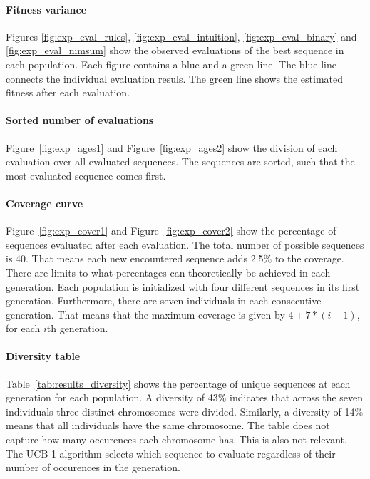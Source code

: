 \paragraph{Fitness variance}
Figures \ref{fig:exp_eval_rules}, \ref{fig:exp_eval_intuition},
\ref{fig:exp_eval_binary} and \ref{fig:exp_eval_nimsum} show the observed
evaluations of the best sequence in each population. Each figure contains a
blue and a green line. The blue line connects the individual evaluation resuls.
The green line shows the estimated fitness after each evaluation.
\paragraph{Sorted number of evaluations}
Figure~\ref{fig:exp_ages1} and Figure~\ref{fig:exp_ages2} show the division of
each evaluation over all evaluated sequences. The sequences are sorted, such
that the most evaluated sequence comes first.
\paragraph{Coverage curve}
Figure~\ref{fig:exp_cover1} and Figure~\ref{fig:exp_cover2} show the percentage
of sequences evaluated after each evaluation. The total number of possible
sequences is 40. That means each new encountered sequence adds 2.5\% to the
coverage. There are limits to what percentages can theoretically be achieved in
each generation. Each population is initialized with four different sequences
in its first generation. Furthermore, there are seven individuals in each
consecutive generation. That means that the maximum coverage is given by
$4+7*(i-1)$, for each $i$th generation.
\paragraph{Diversity table}
Table~\ref{tab:results_diversity} shows the percentage of unique sequences at
each generation for each population. A diversity of 43\% indicates that across
the seven individuals three distinct chromosomes were divided. Similarly, a
diversity of 14\% means that all individuals have the same chromosome. The
table does not capture how many occurences each chromosome has. This is also
not relevant. The UCB-1 algorithm selects which sequence to evaluate regardless
of their number of occurences in the generation.
